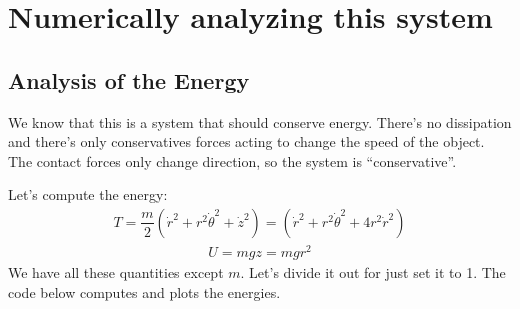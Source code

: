\documentclass[letterpaper,10pt,english]{jupyterBook}
\begin{document}
\section{Numerically analyzing this system}
\label{\detokenize{content/1_mechanics/lagrange_2:numerically-analyzing-this-system}}

\subsection{Analysis of the Energy}
\label{\detokenize{content/1_mechanics/lagrange_2:analysis-of-the-energy}}
\sphinxAtStartPar
We know that this is a system that should conserve energy. There’s no dissipation and there’s only conservatives forces acting to change the speed of the object. The contact forces only change direction, so the system is “conservative”.

\sphinxAtStartPar
Let’s compute the energy:
\begin{equation*}
\begin{split}T = \dfrac{m}{2}\left(\dot{r}^2 + r^2\dot{\theta}^2 + \dot{z}^2\right) = (\dot{r}^2 + r^2\dot{\theta}^2 + 4r^2\dot{r}^2)\end{split}
\end{equation*}\begin{equation*}
\begin{split}U = mgz = mgr^2\end{split}
\end{equation*}
\sphinxAtStartPar
We have all these quantities except \(m\). Let’s divide it out for just set it to 1. The code below computes and plots the energies.
\end{document}
